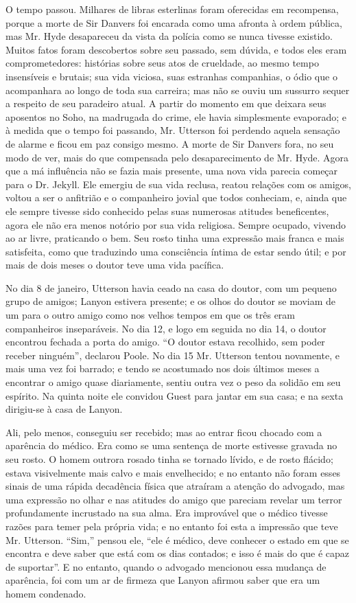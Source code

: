 O tempo passou.  Milhares de libras esterlinas foram oferecidas em
recompensa, porque a morte de Sir Danvers foi encarada como uma afronta
à ordem pública, mas Mr. Hyde desapareceu da vista da polícia como se
nunca tivesse existido.  Muitos fatos foram descobertos sobre seu
passado, sem dúvida, e todos eles eram comprometedores: histórias sobre
seus atos de crueldade, ao mesmo tempo insensíveis e brutais; sua vida
viciosa, suas estranhas companhias, o ódio que o acompanhara ao longo
de toda sua carreira; mas não se ouviu um sussurro sequer a respeito de
seu paradeiro atual.  A partir do momento em que deixara seus aposentos
no Soho, na madrugada do crime, ele havia simplesmente evaporado; e
à medida que o tempo foi passando, Mr. Utterson foi perdendo aquela
sensação de alarme e ficou em paz consigo mesmo.  A morte de Sir
Danvers fora, no seu modo de ver, mais do que compensada pelo
desaparecimento de Mr. Hyde.  Agora que a má influência não se fazia
mais presente, uma nova vida parecia começar para o Dr. Jekyll. Ele
emergiu de sua vida reclusa, reatou relações com os amigos, voltou a
ser o anfitrião e o companheiro jovial que todos conheciam, e, ainda
que ele sempre tivesse sido conhecido pelas suas numerosas atitudes
beneficentes, agora ele não era menos notório por sua vida religiosa. 
Sempre ocupado, vivendo ao ar livre, praticando o bem.  Seu rosto tinha
uma expressão mais franca e mais satisfeita, como que traduzindo uma
consciência íntima de estar sendo útil; e por mais de dois meses o
doutor teve uma vida pacífica.

No dia 8 de janeiro, Utterson havia ceado na casa do doutor, com
um pequeno grupo de amigos; Lanyon estivera presente; e os olhos do
doutor se moviam de um para o outro amigo como nos velhos tempos em que
os três eram companheiros inseparáveis.  No dia 12, e logo em seguida
no dia 14, o doutor encontrou fechada a porta do amigo.  “O doutor
estava recolhido, sem poder receber ninguém”, declarou Poole.  No dia
15 Mr. Utterson tentou novamente, e mais uma vez foi barrado; e tendo
se acostumado nos dois últimos meses a encontrar o amigo quase
diariamente, sentiu outra vez o peso da solidão em seu espírito.  Na
quinta noite ele convidou Guest para jantar em sua casa; e na sexta
dirigiu-se à casa de Lanyon.

Ali, pelo menos, conseguiu ser recebido; mas ao entrar ficou chocado com
a aparência do médico.  Era como se uma sentença de morte estivesse
gravada no seu rosto.  O homem outrora rosado tinha se tornado lívido,
e de rosto flácido; estava visivelmente mais calvo e mais envelhecido;
e no entanto não foram esses sinais de uma rápida decadência física que
atraíram a atenção do advogado, mas uma expressão no olhar e nas
atitudes do amigo que pareciam revelar um terror profundamente
incrustado na sua alma.  Era improvável que o médico tivesse razões
para temer pela própria vida; e no entanto foi esta a impressão que
teve Mr. Utterson.  “Sim,” pensou ele, “ele é médico, deve conhecer o
estado em que se encontra e deve saber que está com os dias contados; e
isso é mais do que é capaz de suportar”.  E no entanto, quando o
advogado mencionou essa mudança de aparência, foi com um ar de firmeza
que Lanyon afirmou saber que era um homem condenado.


